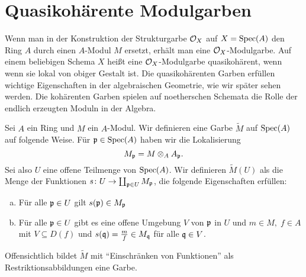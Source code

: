 
\chapter{Quasikohärente Modulgarben}
\label{chap:9}

Wenn man in der Konstruktion der Strukturgarbe $\mathcal{O}_X$ auf $X = \operatorname{Spec}(A)$ den Ring $A$ durch einen $A$-Modul $M$ ersetzt, erhält man eine $\mathcal{O}_X$-Modulgarbe. Auf einem beliebigen Schema $X$ heißt eine $\mathcal{O}_X$-Modulgarbe quasikohärent, wenn wenn sie lokal von obiger Gestalt ist. Die quasikohärenten Garben erfüllen wichtige Eigenschaften in der algebraischen Geometrie, wie wir später sehen werden. Die kohärenten Garben spielen auf noetherschen Schemata die Rolle der endlich erzeugten Moduln in der Algebra.

\begin{kons}
\label{kons:9.1}
	Sei $A$ ein Ring und $M$ ein $A$-Modul. Wir definieren eine Garbe $\widetilde{M}$ auf $\operatorname{Spec}(A)$ auf folgende Weise. Für $\mathfrak{p} \in \operatorname{Spec}(A)$ haben wir die Lokalisierung
	\[
		M_{\mathfrak{p}} = M \otimes_A A_{\mathfrak{p}}.
	\]
	Sei also $U$ eine offene Teilmenge von $\operatorname{Spec}(A)$. Wir definieren $\widetilde{M}(U)$ als die Menge der Funktionen $s \colon U \to \coprod_{\mathfrak{p} \in U} M_{\mathfrak{p}}$, die folgende Eigenschaften erfüllen:
	\begin{enumerate}[a)]
		\item Für alle $\mathfrak{p} \in U$ gilt $s(\mathfrak{p}) \in M_{\mathfrak{p}}$
		\item Für alle $\mathfrak{p} \in U$ gibt es eine offene Umgebung $V$ von $\mathfrak{p}$ in $U$ und $m\in M,\;f\in A$ mit $V \subseteq D(f)$ und $s(\mathfrak{q}) = \frac{m}{f} \in M_{\mathfrak{q}}$ für alle $\mathfrak{q} \in V$.
	\end{enumerate}
	Offensichtlich bildet $\widetilde{M}$ mit \enquote{Einschränken von Funktionen} als Restriktionsabbildungen eine Garbe.
\end{kons}

